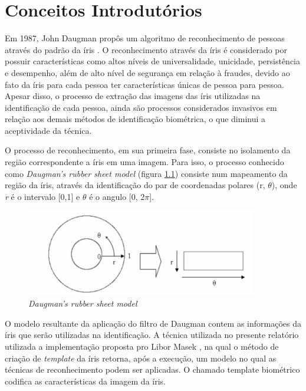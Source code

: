\chapter{Conceitos Introdutórios}\label{cap:introducao}

Em 1987, John Daugman propôs um algoritmo de reconhecimento de pessoas através do padrão da íris \cite{daugman2004iris}. O reconhecimento através da íris é considerado por possuir características como altos níveis de universalidade, unicidade, persistência e desempenho, além de alto nível de segurança em relação à fraudes, devido ao fato da íris para cada pessoa ter características únicas de pessoa para pessoa. 
Apesar disso, o processo de extração das imagens das íris utilizadas na identificação de cada pessoa, ainda são processos considerados invasivos em relação aos demais métodos de identificação biométrica, o que diminui a aceptividade da técnica. 

O processo de reconhecimento, em sua primeira fase, consiste no isolamento da região correspondente a íris em uma imagem. Para isso, o processo conhecido como \textit{Daugman's rubber sheet model} (figura \ref{fig:daugman}) consiste num mapeamento da região da íris, através da identificação do par de coordenadas polares (r, $\theta$), onde \textit{r} é o intervalo [0,1] e $\theta$ é o angulo [0, 2$\pi$]. 

\begin{figure}[htb]
	\caption{\label{fig:daugman}\textit{Daugman's rubber sheet model} }
	\begin{center}
		\includegraphics[width=0.90\textwidth]{img/daugman.png}
	\end{center}
\end{figure}

O modelo resultante da aplicação do filtro de Daugman contem as informações da íris que serão utilizadas na identificação. A técnica utilizada no presente relatório utilizada a implementação proposta pro Libor Masek \cite{masek2004}, na qual o método de criação de \textit{template} da íris retorna, após a execução, um modelo no qual as técnicas de reconhecimento podem ser aplicadas. O chamado template biométrico codifica as características da imagem da íris. 
 
